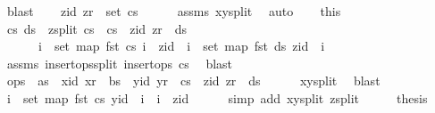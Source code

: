 \begin{isabellebody}
\ blast\isanewline
\ \ \isamarkupfalse%
\ {\isachardoublequoteopen}{\isacharparenleft}zid{\isacharcomma}\ zr{\isacharparenright}\ {\isasymin}\ set\ cs{}{\isachardoublequoteclose}\isanewline
\ \ \ \ \isamarkupfalse%
\ assms\ xy{\isacharunderscore}split\ \isamarkupfalse%
\ auto\isanewline
\ \ \isamarkupfalse%
\ this\ \isamarkupfalse%
\ cs\ ds\ \ z{\isacharunderscore}split{\isacharcolon}\ {\isachardoublequoteopen}cs{}\ {\isacharequal}\ cs\ {\isacharat}\ {\isacharbrackleft}{\isacharparenleft}zid{\isacharcomma}\ zr{\isacharparenright}{\isacharbrackright}\ {\isacharat}\ ds\ {\isasymand}\isanewline
\ \ \ \ \ \ {\isacharparenleft}{\isasymforall}i\ {\isasymin}\ set\ {\isacharparenleft}map\ fst\ cs{\isacharparenright}{\isachardot}\ i\ {\isacharless}\ zid{\isacharparenright}\ {\isasymand}\ {\isacharparenleft}{\isasymforall}i\ {\isasymin}\ set\ {\isacharparenleft}map\ fst\ ds{\isacharparenright}{\isachardot}\ zid\ {\isacharless}\ i{\isacharparenright}{\isachardoublequoteclose}\isanewline
\ \ \ \ \isamarkupfalse%
\ assms\ insert{\isacharunderscore}ops{\isacharunderscore}split\ {\isacartoucheopen}insert{\isacharunderscore}ops\ cs{}{\isacartoucheclose}\ \isamarkupfalse%
\ blast\isanewline
\ \ \isamarkupfalse%
\ {\isachardoublequoteopen}ops\ {\isacharequal}\ as\ {\isacharat}\ {\isacharbrackleft}{\isacharparenleft}xid{\isacharcomma}\ xr{\isacharparenright}{\isacharbrackright}\ {\isacharat}\ bs\ {\isacharat}\ {\isacharbrackleft}{\isacharparenleft}yid{\isacharcomma}\ yr{\isacharparenright}{\isacharbrackright}\ {\isacharat}\ cs\ {\isacharat}\ {\isacharbrackleft}{\isacharparenleft}zid{\isacharcomma}\ zr{\isacharparenright}{\isacharbrackright}\ {\isacharat}\ ds{\isachardoublequoteclose}\isanewline
\ \ \ \ \isamarkupfalse%
\ xy{\isacharunderscore}split\ \isamarkupfalse%
\ blast\isanewline
\ \ \isamarkupfalse%
\ \isamarkupfalse%
\ {\isachardoublequoteopen}{\isasymforall}i\ {\isasymin}\ set\ {\isacharparenleft}map\ fst\ cs{\isacharparenright}{\isachardot}\ yid\ {\isacharless}\ i\ {\isasymand}\ i\ {\isacharless}\ zid{\isachardoublequoteclose}\isanewline
\ \ \ \ \isamarkupfalse%
\ {\isacharparenleft}simp\ add{\isacharcolon}\ xy{\isacharunderscore}split\ z{\isacharunderscore}split{\isacharparenright}\isanewline
\ \ \isamarkupfalse%
\ \isamarkupfalse%
\ {\isacharquery}thesis\isanewline

\end{isabellebody}

